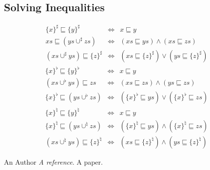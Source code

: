 \documentclass[portrait]{sciposter}
\begin{document}
\begin{multicols}{3}
\subsection{Solving Inequalities}
\begin{sectionbox}{}
\begin{eqnarray}
\{x\}^{\sharp}\sqsubseteq\{y\}^{\sharp} & \iff & x\sqsubseteq y\nonumber \\
xs\sqsubseteq(ys\cup^{\sharp}zs) & \iff & (xs\sqsubseteq ys)\wedge(xs\sqsubseteq zs)\nonumber \\
(xs\cup^{\sharp}ys)\sqsubseteq\{z\}^{\sharp} & \iff & (xs\sqsubseteq\{z\}^{\sharp})\vee(ys\sqsubseteq\{z\}^{\sharp})\nonumber
\end{eqnarray}
\begin{eqnarray}
\{x\}^{\flat}\sqsubseteq\{y\}^{\flat} & \iff & x\sqsubseteq y\nonumber \\
(xs\cup^{\flat}ys)\sqsubseteq zs & \iff & (xs\sqsubseteq zs)\wedge(ys\sqsubseteq zs)\nonumber \\
\{x\}^{\flat}\sqsubseteq(ys\cup^{\flat}zs) & \iff & (\{x\}^{\flat}\sqsubseteq ys)\vee(\{x\}^{\flat}\sqsubseteq zs)\nonumber
\end{eqnarray}
\begin{eqnarray}
\{x\}^{\natural}\sqsubseteq\{y\}^{\natural} & \iff & x\sqsubseteq y\nonumber \\
\{x\}^{\natural}\sqsubseteq(ys\cup^{\natural}zs) & \iff & (\{x\}^{\natural}\sqsubseteq ys)\wedge(\{x\}^{\natural}\sqsubseteq zs)\nonumber \\
(xs\cup^{\natural}ys)\sqsubseteq\{z\}^{\natural} & \iff & (xs\sqsubseteq\{z\}^{\natural})\wedge(ys\sqsubseteq\{z\}^{\natural})\nonumber
\end{eqnarray}
\end{sectionbox}

\end{multicols}


\begin{thebibliography}{m}

An Author
{\em A reference}.
A paper.

\end{thebibliography}

\end{document}
